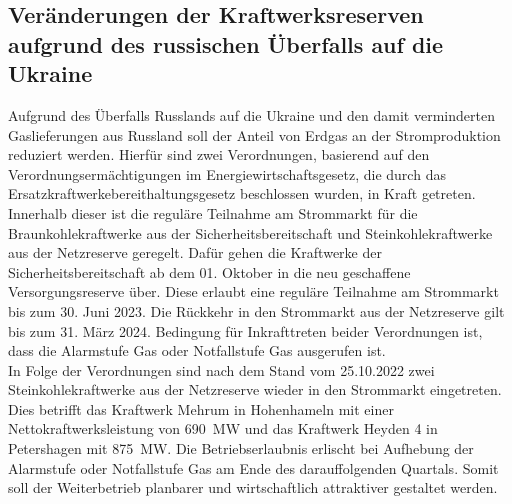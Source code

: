 		
	\subsection{Veränderungen der Kraftwerksreserven aufgrund des russischen Überfalls auf die Ukraine}
	
		Aufgrund des Überfalls Russlands auf die Ukraine und den damit verminderten Gaslieferungen aus Russland soll der Anteil von Erdgas an der Stromproduktion reduziert werden.
		Hierfür sind zwei Verordnungen, basierend auf den Verordnungsermächtigungen im Energiewirtschaftsgesetz, die durch das Ersatzkraftwerkebereithaltungsgesetz beschlossen wurden, in Kraft getreten.
		Innerhalb dieser ist die reguläre Teilnahme am Strommarkt für die Braunkohlekraftwerke aus der Sicherheitsbereitschaft und Steinkohlekraftwerke aus der Netzreserve geregelt.
		Dafür gehen die Kraftwerke der Sicherheitsbereitschaft ab dem 01. Oktober in die neu geschaffene Versorgungsreserve über.
		Diese erlaubt eine reguläre Teilnahme am Strommarkt bis zum 30. Juni 2023.
		Die Rückkehr in den Strommarkt aus der Netzreserve gilt bis zum 31. März 2024.
		Bedingung für Inkrafttreten beider Verordnungen ist, dass die Alarmstufe Gas oder Notfallstufe Gas ausgerufen ist. \\
		
		In Folge der Verordnungen sind nach dem Stand vom 25.10.2022 zwei Steinkohlekraftwerke aus der Netzreserve wieder in den Strommarkt eingetreten.
		Dies betrifft das Kraftwerk Mehrum in Hohenhameln mit einer Nettokraftwerksleistung von \SI{690}{\mega\watt} und das Kraftwerk Heyden 4 in Petershagen mit \SI{875}{\mega\watt}.
		Die Betriebserlaubnis erlischt bei Aufhebung der Alarmstufe oder Notfallstufe Gas am Ende des darauffolgenden Quartals.
		Somit soll der Weiterbetrieb planbarer und wirtschaftlich attraktiver gestaltet werden.
		
		
		
\clearpage
	